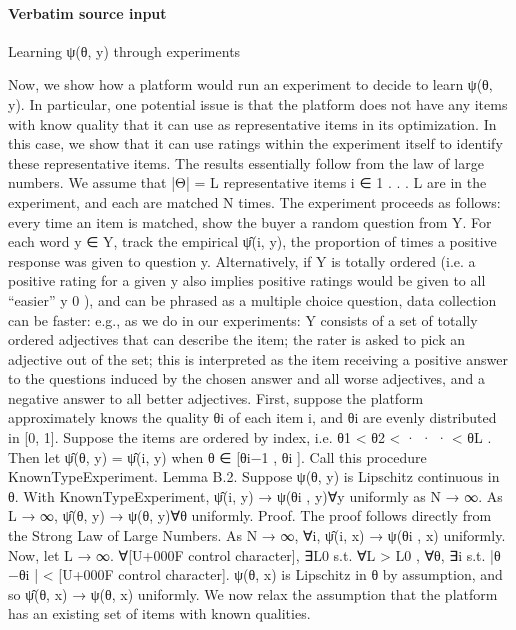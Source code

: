 \documentclass[10pt]{article}
\begin{document}
\paragraph{Verbatim source input}
\begin{ReviewVerbatim}
Learning ψ(θ, y) through experiments

Now, we show how a platform would run an experiment to decide to learn ψ(θ, y). In particular,
one potential issue is that the platform does not have any items with know quality that it can use
as representative items in its optimization. In this case, we show that it can use ratings within the
experiment itself to identify these representative items. The results essentially follow from the law
of large numbers.
We assume that |Θ| = L representative items i ∈ {1 . . . L} are in the experiment, and each are
matched N times. The experiment proceeds as follows: every time an item is matched, show the
buyer a random question from Y. For each word y ∈ Y, track the empirical ψ̂(i, y), the proportion
of times a positive response was given to question y. Alternatively, if Y is totally ordered (i.e. a
positive rating for a given y also implies positive ratings would be given to all “easier” y 0 ), and
can be phrased as a multiple choice question, data collection can be faster: e.g., as we do in our
experiments: Y consists of a set of totally ordered adjectives that can describe the item; the rater is
asked to pick an adjective out of the set; this is interpreted as the item receiving a positive answer
to the questions induced by the chosen answer and all worse adjectives, and a negative answer to
all better adjectives.
First, suppose the platform approximately knows the quality θi of each item i, and θi are evenly
distributed in [0, 1]. Suppose the items are ordered by index, i.e. θ1 < θ2 < · · · < θL . Then let
ψ̂(θ, y) = ψ̂(i, y) when θ ∈ [θi−1 , θi ]. Call this procedure KnownTypeExperiment.
Lemma B.2. Suppose ψ(θ, y) is Lipschitz continuous in θ. With KnownTypeExperiment, ψ̂(i, y) →
ψ(θi , y)∀y uniformly as N → ∞. As L → ∞, ψ̂(θ, y) → ψ(θ, y)∀θ uniformly.
Proof. The proof follows directly from the Strong Law of Large Numbers. As N → ∞, ∀i, ψ̂(i, x) →
ψ(θi , x) uniformly. Now, let L → ∞. ∀[U+000F control character], ∃L0 s.t. ∀L > L0 , ∀θ, ∃i s.t. |θ −θi | < [U+000F control character]. ψ(θ, x) is Lipschitz
in θ by assumption, and so ψ̂(θ, x) → ψ(θ, x) uniformly.
We now relax the assumption that the platform has an existing set of items with known qualities.
\end{ReviewVerbatim}
\end{document}
